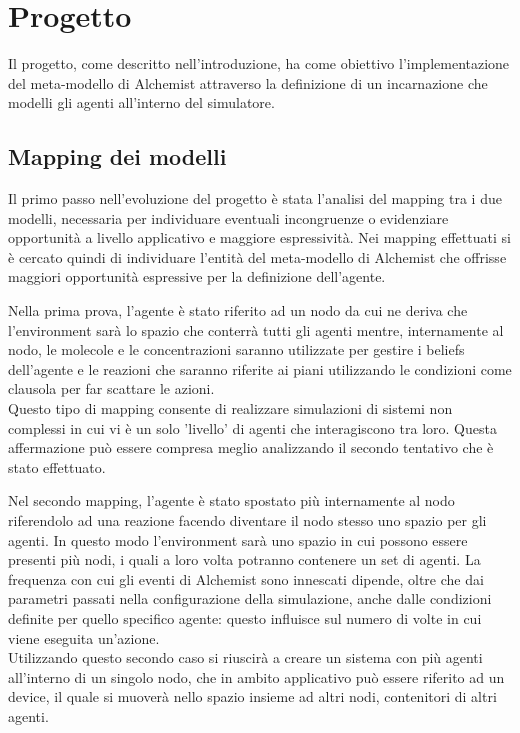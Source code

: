 \documentclass[12pt,a4paper,openright,twoside]{report}
\begin{document}
\chapter{Progetto}
\lhead[\fancyplain{}{\bfseries\thepage}]{\fancyplain{}{\bfseries\rightmark}}

Il progetto, come descritto nell'introduzione, ha come obiettivo l'implementazione del meta-modello di Alchemist attraverso la definizione di un incarnazione che modelli gli agenti all'interno del simulatore.

\section{Mapping dei modelli}
Il primo passo nell'evoluzione del progetto \`e stata l'analisi del mapping tra i due modelli, necessaria per individuare eventuali incongruenze o evidenziare opportunit\`a a livello applicativo e maggiore espressivit\`a.
Nei mapping effettuati si \`e cercato quindi di individuare l'entit\`a del meta-modello di Alchemist che offrisse maggiori opportunit\`a espressive per la definizione dell'agente.

Nella prima prova, l'agente \`e stato riferito ad un nodo da cui ne deriva che l'environment sar\`a lo spazio che conterr\`a tutti gli agenti mentre, internamente al nodo, le molecole e le concentrazioni saranno utilizzate per gestire i beliefs dell'agente e le reazioni che saranno riferite ai piani utilizzando le condizioni come clausola per far scattare le azioni.
\\
Questo tipo di mapping consente di realizzare simulazioni di sistemi non complessi in cui vi \`e un solo 'livello' di agenti che interagiscono tra loro. Questa affermazione pu\`o essere compresa meglio analizzando il secondo tentativo che \`e stato effettuato.

Nel secondo mapping, l'agente \`e stato spostato pi\`u internamente al nodo riferendolo ad una reazione facendo diventare il nodo stesso uno spazio per gli agenti. In questo modo l'environment sar\`a uno spazio in cui possono essere presenti pi\`u nodi, i quali a loro volta potranno contenere un set di agenti. La frequenza con cui gli eventi di Alchemist sono innescati dipende, oltre che dai parametri passati nella configurazione della simulazione, anche dalle condizioni definite per quello specifico agente: questo influisce sul numero di volte in cui viene eseguita un'azione.
\\
Utilizzando questo secondo caso si riuscir\`a a creare un sistema con pi\`u agenti all'interno di un singolo nodo, che in ambito applicativo pu\`o essere riferito ad un device, il quale si muover\`a nello spazio insieme ad altri nodi, contenitori di altri agenti.
\end{document}
